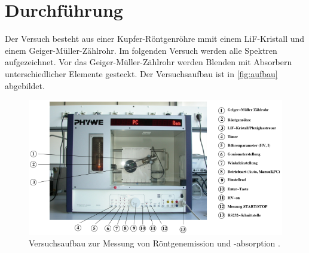 \section{Durchführung}
\label{sec:Durchführung}
Der Versuch besteht aus einer Kupfer-Röntgenröhre mmit einem LiF-Kristall und einem Geiger-Müller-Zählrohr. Im folgenden Versuch werden alle Spektren aufgezeichnet.
Vor das Geiger-Müller-Zählrohr werden Blenden mit Absorbern unterschiedlicher Elemente gesteckt. Der Versuchsaufbau ist in \autoref{fig:aufbau} abgebildet.
\begin{figure}[H]
    \centering
    \includegraphics[width = 0.4 \textwidth]{data/aufbau.png}
    \caption{Versuchsaufbau zur Messung von Röntgenemission und -absorption \cite{Anleitung602}.}
    \label{fig:aufbau}
\end{figure}
